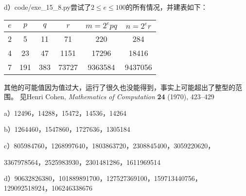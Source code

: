 d）code/exe\_15\_8.py尝试了$2\le e\le 100$的所有情况，并建表如下：
\begin{center}
\begin{tabular}{c|c|c|c|c|c}
\hline
$e$ & $p$ & $q$ & $r$ & $m=2^epq$ & $n=2^er$ \\
\hline
2 & 5 & 11 & 71 & 220 & 284 \\
\hline
4 & 23 & 47 & 1151 & 17296 & 18416 \\
\hline
7 & 191 & 383 & 73727 & 9363584 & 9437056 \\
\hline
\end{tabular}
\end{center}
其他的可能值因为值过大，运行了很久也没能得到，事实上可能超出了整型的范围。
%
\exercise 见Henri Cohen, \emph{Mathematics of Computation} {\bf 24} (1970), 423--429\par
a）12496，14288，15472，14536，14264\par
b）1264460，1547860，1727636，1305184\par
c）805984760，1268997640，1803863720，2308845400，3059220620，\par
3367978564，2525983930，2301481286，1611969514\par
d）90632826380，101889891700，127527369100，159713440756，129092518924，106246338676
